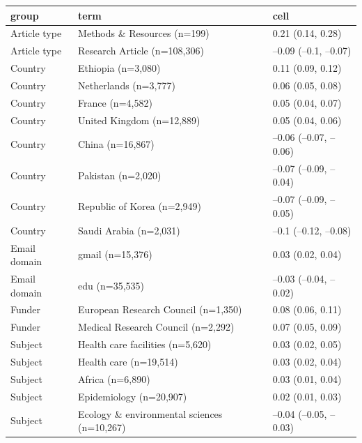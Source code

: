 \begin{table}[ht]
\centering
\begin{tabular}{lll}
 group & term & cell \\ 
  \hline
Article type & Methods \& Resources
(n=199) & 0.21 (0.14, 0.28) \\ 
  Article type & Research Article
(n=108,306) & --0.09 (--0.1, --0.07) \\ 
  Country & Ethiopia
(n=3,080) & 0.11 (0.09, 0.12) \\ 
  Country & Netherlands
(n=3,777) & 0.06 (0.05, 0.08) \\ 
  Country & France
(n=4,582) & 0.05 (0.04, 0.07) \\ 
  Country & United Kingdom
(n=12,889) & 0.05 (0.04, 0.06) \\ 
  Country & China
(n=16,867) & --0.06 (--0.07, --0.06) \\ 
  Country & Pakistan
(n=2,020) & --0.07 (--0.09, --0.04) \\ 
  Country & Republic of Korea
(n=2,949) & --0.07 (--0.09, --0.05) \\ 
  Country & Saudi Arabia
(n=2,031) & --0.1 (--0.12, --0.08) \\ 
  Email domain & gmail
(n=15,376) & 0.03 (0.02, 0.04) \\ 
  Email domain & edu
(n=35,535) & --0.03 (--0.04, --0.02) \\ 
  Funder & European Research Council
(n=1,350) & 0.08 (0.06, 0.11) \\ 
  Funder & Medical Research Council
(n=2,292) & 0.07 (0.05, 0.09) \\ 
  Subject & Health care facilities
(n=5,620) & 0.03 (0.02, 0.05) \\ 
  Subject & Health care
(n=19,514) & 0.03 (0.02, 0.04) \\ 
  Subject & Africa
(n=6,890) & 0.03 (0.01, 0.04) \\ 
  Subject & Epidemiology
(n=20,907) & 0.02 (0.01, 0.03) \\ 
  Subject & Ecology \& environmental sciences
(n=10,267) & --0.04 (--0.05, --0.03) \\ 
  \end{tabular}
\end{table}
